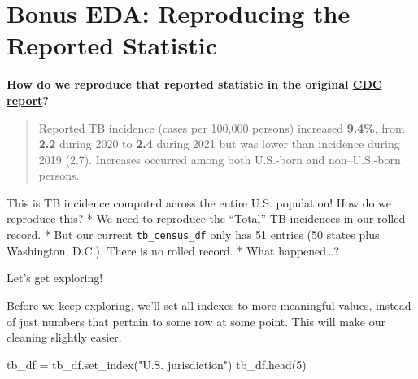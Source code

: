 \documentclass[
  letterpaper,
  DIV=11,
  numbers=noendperiod]{scrreprt}
\newenvironment{Shaded}{\begin{snugshade}}{\end{snugshade}}
\newcommand{\DecValTok}[1]{\textcolor[rgb]{0.68,0.00,0.00}{#1}}
\newcommand{\NormalTok}[1]{\textcolor[rgb]{0.00,0.23,0.31}{#1}}
\newcommand{\OperatorTok}[1]{\textcolor[rgb]{0.37,0.37,0.37}{#1}}
\newcommand{\StringTok}[1]{\textcolor[rgb]{0.13,0.47,0.30}{#1}}
\begin{document}
\hypertarget{bonus-eda-reproducing-the-reported-statistic}{%
\section{Bonus EDA: Reproducing the Reported
Statistic}\label{bonus-eda-reproducing-the-reported-statistic}}

\textbf{How do we reproduce that reported statistic in the original
\href{https://www.cdc.gov/mmwr/volumes/71/wr/mm7112a1.htm?s_cid=mm7112a1_w}{CDC
report}?}

\begin{quote}
Reported TB incidence (cases per 100,000 persons) increased
\textbf{9.4\%}, from \textbf{2.2} during 2020 to \textbf{2.4} during
2021 but was lower than incidence during 2019 (2.7). Increases occurred
among both U.S.-born and non--U.S.-born persons.
\end{quote}

This is TB incidence computed across the entire U.S. population! How do
we reproduce this? * We need to reproduce the ``Total'' TB incidences in
our rolled record. * But our current \texttt{tb\_census\_df} only has 51
entries (50 states plus Washington, D.C.). There is no rolled record. *
What happened\ldots?

Let's get exploring!

Before we keep exploring, we'll set all indexes to more meaningful
values, instead of just numbers that pertain to some row at some point.
This will make our cleaning slightly easier.

\begin{Shaded}
\begin{Highlighting}[]
\NormalTok{tb\_df }\OperatorTok{=}\NormalTok{ tb\_df.set\_index(}\StringTok{"U.S. jurisdiction"}\NormalTok{)}
\NormalTok{tb\_df.head(}\DecValTok{5}\NormalTok{)}
\end{Highlighting}
\end{Shaded}
\end{document}
